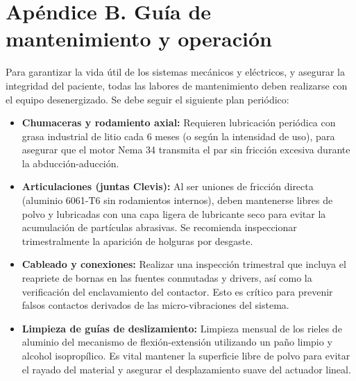 	 \section*{Apéndice B. Guía de mantenimiento y operación}\label{sec:planos de manufactura}
  Para garantizar la vida útil de los sistemas mecánicos y eléctricos, y asegurar la integridad del paciente, todas las labores de mantenimiento deben realizarse con el equipo desenergizado. Se debe seguir el siguiente plan periódico:
  \begin{itemize}
    \item \textbf{Chumaceras y rodamiento axial:} Requieren lubricación periódica con grasa industrial de litio cada 6 meses (o según la intensidad de uso), para asegurar que el motor Nema 34 transmita el par sin fricción excesiva durante la abducción-aducción.
    
    \item \textbf{Articulaciones (juntas Clevis):} Al ser uniones de fricción directa (aluminio 6061-T6 sin rodamientos internos), deben mantenerse libres de polvo y lubricadas con una capa ligera de lubricante seco para evitar la acumulación de partículas abrasivas. Se recomienda inspeccionar trimestralmente la aparición de holguras por desgaste.
    
    \item \textbf{Cableado y conexiones:} Realizar una inspección trimestral que incluya el reapriete de bornas en las fuentes conmutadas y drivers, así como la verificación del enclavamiento del contactor. Esto es crítico para prevenir falsos contactos derivados de las micro-vibraciones del sistema.
    
   \item \textbf{Limpieza de guías de deslizamiento:} Limpieza mensual de los rieles de aluminio del mecanismo de flexión-extensión utilizando un paño limpio y alcohol isopropílico. Es vital mantener la superficie libre de polvo para evitar el rayado del material y asegurar el desplazamiento suave del actuador lineal.

   \end{itemize}
	
